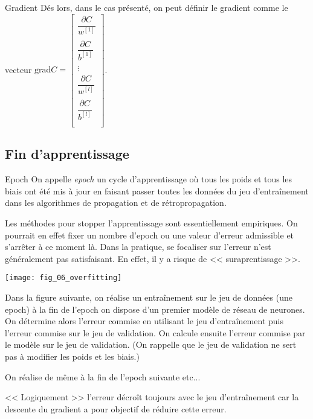 \begin{defi}{Gradient}
Dés lors, dans le cas présenté, on peut définir le gradient comme le vecteur
$\text{grad} C = \begin{bmatrix}
\dfrac{\partial C}{w^{[1]}_{}} \\
\dfrac{\partial C}{b^{[1]}_{}} \\
\vdots
\\
\dfrac{\partial C}{w^{[l]}_{}} \\
\dfrac{\partial C}{b^{[l]}_{}} \\

\end{bmatrix}
$.


\end{defi}

\subsection{Fin d'apprentissage}

\begin{defi}{Epoch}
On appelle \textit{epoch} un cycle d'apprentissage où tous les poids et tous les biais ont été mis à jour en faisant passer toutes les données du jeu d’entraînement dans les algorithmes de propagation et de rétropropagation.
\end{defi}

Les méthodes pour stopper l'apprentissage sont essentiellement empiriques. On pourrait en effet fixer un nombre d'epoch ou une valeur d'erreur admissible et s'arrêter à ce moment là. Dans la pratique, se focaliser sur l'erreur n'est généralement pas satisfaisant. En effet, il y a risque de << suraprentissage >>.

\begin{center}
\texttt{[image: fig\_06\_overfitting]}
\end{center}

Dans la figure suivante, on réalise un entraînement sur le jeu de données (une epoch) à la fin de l'epoch on dispose d'un premier modèle de réseau de neurones.  On détermine alors l'erreur commise en utilisant le jeu d'entraînement puis l'erreur commise sur le jeu de validation.  On calcule ensuite l'erreur commise par le modèle sur le jeu de validation. (On rappelle que le jeu de validation ne sert pas à modifier les poids et les biais.)

On réalise de même à la fin de l'epoch suivante etc...

<< Logiquement >> l'erreur décroît toujours avec le jeu d’entraînement car la descente du gradient a pour objectif de réduire cette erreur. 

